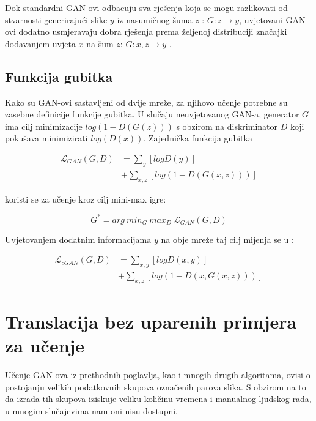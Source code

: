 \documentclass[lmodern, utf8, seminar]{fer}
\newcommand{\Lagr}{\mathcal{L}}
\begin{document}
Dok standardni GAN-ovi odbacuju sva rješenja koja se mogu razlikovati od stvarnosti generirajući slike $y$ iz nasumičnog šuma $z$ : $G: z \rightarrow y$, uvjetovani GAN-ovi dodatno usmjeravaju dobra rješenja prema željenoj distribuciji značajki dodavanjem uvjeta $x$ na šum $z$: $G: {x,z} \rightarrow y$ \cite{isola2017image}.

\newpage
\section{Funkcija gubitka}
Kako su GAN-ovi sastavljeni od dvije mreže, za njihovo učenje potrebne su zasebne definicije funkcije gubitka. U slučaju neuvjetovanog GAN-a, generator $G$ ima cilj minimizacije $log(1 - D(G(z)))$ s obzirom na diskriminator $D$ koji pokušava minimizirati $log(D(x))$.
Zajednička funkcija gubitka

\begin{equation}
\begin{split}
\Lagr_{GAN}(G, D) &= \sum_{y}[log D(y)] \\
			     &+ \sum_{x,z}[log(1 - D(G(x,z)))]
\end{split}
\end{equation}


koristi se za učenje kroz cilj mini-max igre:

\begin{equation}
G^{*} = arg \: min_G \: max_D \: \Lagr_{GAN}(G, D)
\end{equation}

Uvjetovanjem dodatnim informacijama $y$ na obje mreže taj cilj mijenja se u : 

\begin{equation}
\begin{split}
\Lagr_{cGAN}(G, D) &= \sum_{x,y}[log D(x,y)] \\
			       &+ \sum_{x,z}[log(1 - D(x, G(x,z)))]
\end{split}
\end{equation}



\chapter{Translacija bez uparenih primjera za učenje}
Učenje GAN-ova iz prethodnih poglavlja, kao i mnogih drugih algoritama, ovisi o postojanju velikih podatkovnih skupova označenih parova slika. S obzirom na to da izrada tih skupova iziskuje veliku količinu vremena i manualnog ljudskog rada, u mnogim slučajevima nam oni nisu dostupni.
\newline
\end{document}
